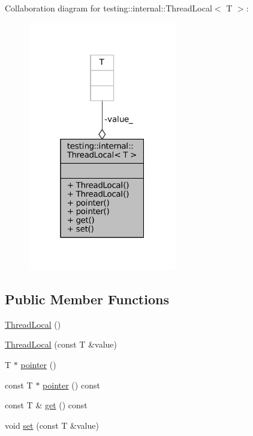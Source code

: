 Collaboration diagram for testing\+:\+:internal\+:\+:Thread\+Local$<$ T $>$\+:
\nopagebreak
\begin{figure}[H]
\begin{center}
\leavevmode
\includegraphics[width=184pt]{classtesting_1_1internal_1_1ThreadLocal__coll__graph}
\end{center}
\end{figure}
\subsection*{Public Member Functions}
\begin{DoxyCompactItemize}
\item 
\hyperlink{classtesting_1_1internal_1_1ThreadLocal_a106f3a3ad15d08f95f9887105d2a1af5}{Thread\+Local} ()
\item 
\hyperlink{classtesting_1_1internal_1_1ThreadLocal_a85610bdfdbc93a4c56215e0aad7da870}{Thread\+Local} (const T \&value)
\item 
T $\ast$ \hyperlink{classtesting_1_1internal_1_1ThreadLocal_a882f57fed4b074de83693c0c0fe62858}{pointer} ()
\item 
const T $\ast$ \hyperlink{classtesting_1_1internal_1_1ThreadLocal_a57e45bb60e3cd94abb04fa449e9f0367}{pointer} () const
\item 
const T \& \hyperlink{classtesting_1_1internal_1_1ThreadLocal_ac56aeb97991824979bf192c63d1466f8}{get} () const
\item 
void \hyperlink{classtesting_1_1internal_1_1ThreadLocal_ab5ebc7ba07426cef7167afa2a7707eb4}{set} (const T \&value)
\end{DoxyCompactItemize}
